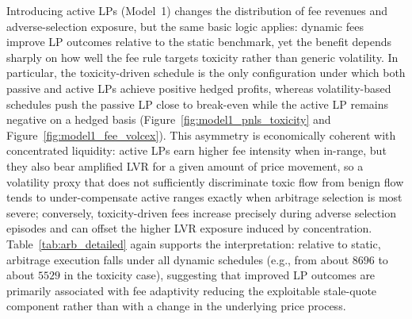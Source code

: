 \documentclass[11pt]{article}
\begin{document}
Introducing active LPs (Model~1) changes the distribution of fee revenues and adverse-selection exposure, but the same basic logic 
applies: dynamic fees improve LP outcomes relative to the static benchmark, yet the benefit depends sharply on how well the fee rule 
targets toxicity rather than generic volatility. In particular, the toxicity-driven schedule is the only configuration under which 
both passive and active LPs achieve positive hedged profits, whereas volatility-based schedules push the passive LP close to break-even 
while the active LP remains negative on a hedged basis (Figure~\ref{fig:model1_pnls_toxicity} and Figure~\ref{fig:model1_fee_volcex}). 
This asymmetry is economically coherent with concentrated liquidity: active LPs earn higher fee intensity when in-range, but they also 
bear amplified LVR for a given amount of price movement, so a volatility proxy that does not sufficiently discriminate toxic flow from 
benign flow tends to under-compensate active ranges exactly when arbitrage selection is most severe; conversely, toxicity-driven fees 
increase precisely during adverse selection episodes and can offset the higher LVR exposure induced by concentration. 
Table~\ref{tab:arb_detailed} again supports the interpretation: relative to static, arbitrage execution falls under all dynamic 
schedules (e.g., from about $8696$ to about $5529$ in the toxicity case), suggesting that improved LP outcomes are primarily associated 
with fee adaptivity reducing the exploitable stale-quote component rather than with a change in the underlying price process.
\end{document}
